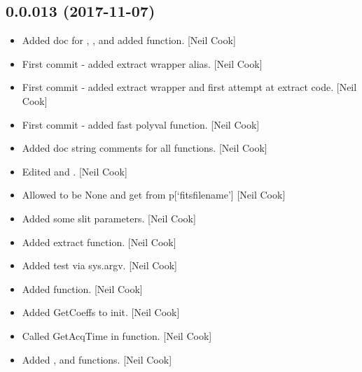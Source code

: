 \documentclass[a4paper,10pt,english]{report}
\begin{document}
\subsection{0.0.013 (2017-11-07)}
\label{\detokenize{misc/changelog:id537}}\begin{itemize}
\item {} 
Added doc for , ,
 and  added
 function. {[}Neil Cook{]}

\item {} 
First commit - added extract wrapper alias. {[}Neil Cook{]}

\item {} 
First commit - added extract wrapper and first attempt at extract
code. {[}Neil Cook{]}

\item {} 
First commit - added fast polyval function. {[}Neil Cook{]}

\item {} 
Added doc string comments for all functions. {[}Neil Cook{]}

\item {} 
Edited  and . {[}Neil Cook{]}

\item {} 
Allowed  to be None and get  from p{[}‘fitsfilename’{]}
{[}Neil Cook{]}

\item {} 
Added some slit parameters. {[}Neil Cook{]}

\item {} 
Added extract function. {[}Neil Cook{]}

\item {} 
Added test via sys.argv. {[}Neil Cook{]}

\item {} 
Added  function. {[}Neil Cook{]}

\item {} 
Added GetCoeffs to init. {[}Neil Cook{]}

\item {} 
Called GetAcqTime in  function. {[}Neil Cook{]}

\item {} 
Added ,  and  functions. {[}Neil
Cook{]}


\end{itemize}
\end{document}
